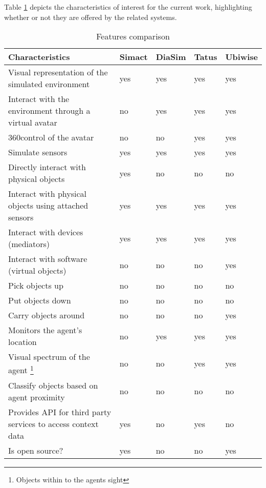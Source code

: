 Table \ref{table:comparison} depicts the characteristics of interest for the current work, highlighting whether or not they are offered by the related systems.

\begin{table}[H]
	\begin{center}
		\small \begin{tabular*}{1.1\columnwidth}{p{6.5cm}llll}
			\\ \hline \hline
			Characteristics & Simact & DiaSim & Tatus & Ubiwise \\ \hline \hline

			Visual representation of the simulated environment & yes & yes & yes & yes \\ \hline
			Interact with the environment through a virtual avatar & no & yes & yes & yes \\ \hline
			360\textdegree control of the avatar & no & no & yes & yes \\ \hline
			Simulate sensors & yes & yes & yes & yes \\ \hline
			Directly interact with physical objects & yes & no & no & no \\ \hline
			Interact with physical objects using attached sensors & yes & yes & yes & yes \\ \hline
			Interact with devices (mediators) & yes & yes & yes & yes \\ \hline
			Interact with software (virtual objects) & no & no & no & yes \\ \hline
			Pick objects up & no & no & no & no \\ \hline
			Put objects down & no & no & no & no \\ \hline
			Carry objects around & no & no & no & yes \\ \hline
			Monitors the agent's location & no & yes & yes & yes \\ \hline
			Visual spectrum of the agent \footnote{Objects within to the agents sight} & no & no & yes & yes \\ \hline
			Classify objects based on agent proximity & no & no & no & no \\ \hline
		 	Provides API for third party services to access context data & yes & no & yes & no \\ \hline
		 	Is open source? & yes & no & no & yes \\ \hline
		\end{tabular*}
		
		\caption{Features comparison}
		\label{table:comparison}
	\end{center}
\end{table}

